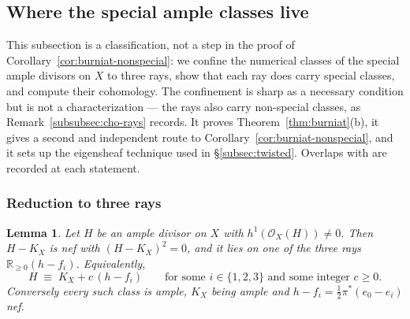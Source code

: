 \documentclass{amsart}
\newtheorem{lemma}[theorem]{Lemma}
\theoremstyle{definition}
\newcommand{\OO}{\mathcal{O}}
\newcommand{\RR}{\mathbb{R}}
\begin{document}
\subsection{Where the special ample classes live}\label{subsec:rays}
This subsection is a classification, not a step in the proof of Corollary~\ref{cor:burniat-nonspecial}: we confine the numerical classes of the special ample divisors on $X$ to three rays, show that each ray does carry special classes, and compute their cohomology. The confinement is sharp as a necessary condition but is not a characterization --- the rays also carry non-special classes, as Remark~\ref{subsubsec:cho-rays} records. It proves Theorem~\ref{thm:burniat}(b), it gives a second and independent route to Corollary~\ref{cor:burniat-nonspecial}, and it sets up the eigensheaf technique used in \S\ref{subsec:twisted}. Overlaps with \cite{Cho26} are recorded at each statement.

\subsubsection{Reduction to three rays}
\begin{lemma}\label{lem:dichotomy}
Let $H$ be an ample divisor on $X$ with $h^1(\OO_X(H))\neq0$. Then $H-K_X$ is nef with $(H-K_X)^2=0$, and it lies on one of the three rays $\RR_{\ge0}(h-f_i)$. Equivalently,
\[
H\;\equiv\;K_X+c\,(h-f_i)\qquad\text{for some }i\in\{1,2,3\}\text{ and some integer }c\ge0 .
\]
Conversely every such class is ample, $K_X$ being ample and $h-f_i=\tfrac12\pi^*(e_0-e_i)$ nef.
\end{lemma}
\end{document}
